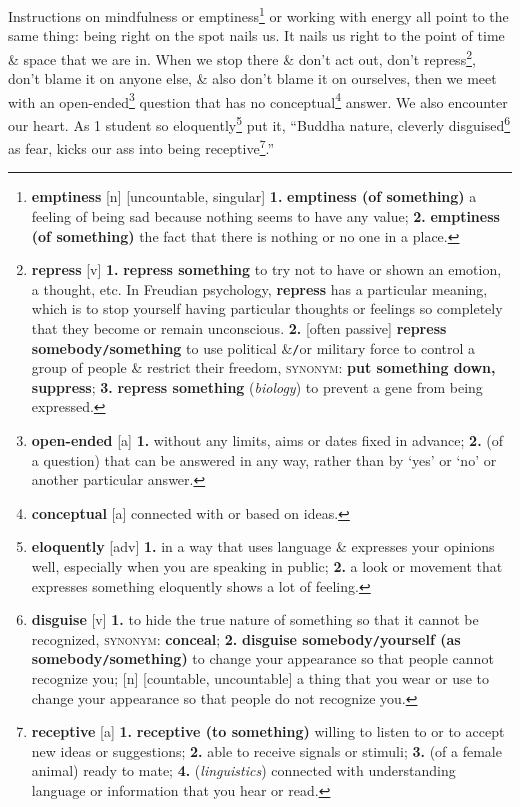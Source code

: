 \documentclass[oneside]{book}
\numberwithin{equation}{section}
\begin{document}
Instructions on mindfulness or emptiness\footnote{\textbf{emptiness} [n] [uncountable, singular] \textbf{1.} \textbf{emptiness (of something)} a feeling of being sad because nothing seems to have any value; \textbf{2.} \textbf{emptiness (of something)} the fact that there is nothing or no one in a place.} or working with energy all point to the same thing: being right on the spot nails us. It nails us right to the point of time \& space that we are in. When we stop there \& don't act out, don't repress\footnote{\textbf{repress} [v] \textbf{1.} \textbf{repress something} to try not to have or shown an emotion, a thought, etc. In Freudian psychology, \textbf{repress} has a particular meaning, which is to stop yourself having particular thoughts or feelings so completely that they become or remain unconscious. \textbf{2.} [often passive] \textbf{repress somebody\texttt{/}something} to use political \&\texttt{/}or military force to control a group of people \& restrict their freedom, \textsc{synonym}: \textbf{put something down, suppress}; \textbf{3.} \textbf{repress something} (\textit{biology}) to prevent a gene from being expressed.}, don't blame it on anyone else, \& also don't blame it on ourselves, then we meet with an open-ended\footnote{\textbf{open-ended} [a] \textbf{1.} without any limits, aims or dates fixed in advance; \textbf{2.} (of a question) that can be answered in any way, rather than by `yes' or `no' or another particular answer.} question that has no conceptual\footnote{\textbf{conceptual} [a] connected with or based on ideas.} answer. We also encounter our heart. As 1 student so eloquently\footnote{\textbf{eloquently} [adv] \textbf{1.} in a way that uses language \& expresses your opinions well, especially when you are speaking in public; \textbf{2.} a look or movement that expresses something eloquently shows a lot of feeling.} put it, ``Buddha nature, cleverly disguised\footnote{\textbf{disguise} [v] \textbf{1.} to hide the true nature of something so that it cannot be recognized, \textsc{synonym}: \textbf{conceal}; \textbf{2.} \textbf{disguise somebody\texttt{/}yourself (as somebody\texttt{/}something)} to change your appearance so that people cannot recognize you; [n] [countable, uncountable] a thing that you wear or use to change your appearance so that people do not recognize you.} as fear, kicks our ass into being receptive\footnote{\textbf{receptive} [a] \textbf{1.} \textbf{receptive (to something)} willing to listen to or to accept new ideas or suggestions; \textbf{2.} able to receive signals or stimuli; \textbf{3.} (of a female animal) ready to mate; \textbf{4.} (\textit{linguistics}) connected with understanding language or information that you hear or read.}.''
\end{document}
